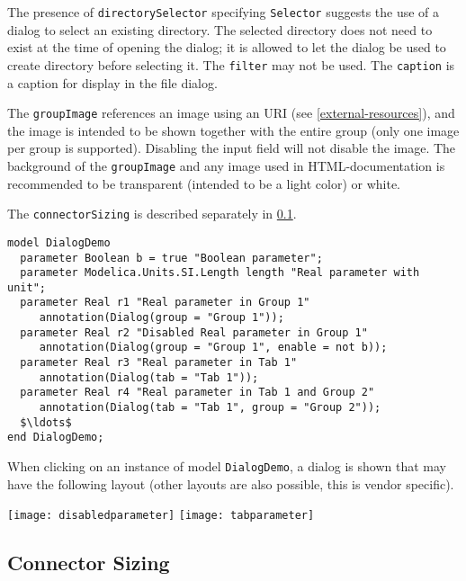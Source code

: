 The presence of \lstinline!directorySelector! specifying \lstinline!Selector! suggests the use of a dialog to select an existing directory.
The selected directory does not need to exist at the time of opening the dialog; it is allowed to let the dialog be used to create directory before selecting it.
The \lstinline!filter! may not be used.
The \lstinline!caption! is a caption for display in the file dialog.

The \lstinline!groupImage! references an image using an URI (see \cref{external-resources}), and the image is intended to be shown together with the entire group (only one image per group is supported).
Disabling the input field will not disable the image.
The background of the \lstinline!groupImage! and any image used in HTML-documentation is recommended to be transparent (intended to be a light color) or white.

The \lstinline!connectorSizing! is described separately in \cref{connector-sizing}.

\begin{example}
\begin{lstlisting}[language=modelica]
model DialogDemo
  parameter Boolean b = true "Boolean parameter";
  parameter Modelica.Units.SI.Length length "Real parameter with unit";
  parameter Real r1 "Real parameter in Group 1"
     annotation(Dialog(group = "Group 1"));
  parameter Real r2 "Disabled Real parameter in Group 1"
     annotation(Dialog(group = "Group 1", enable = not b));
  parameter Real r3 "Real parameter in Tab 1"
     annotation(Dialog(tab = "Tab 1"));
  parameter Real r4 "Real parameter in Tab 1 and Group 2"
     annotation(Dialog(tab = "Tab 1", group = "Group 2"));
  $\ldots$
end DialogDemo;
\end{lstlisting}
When clicking on an instance of model \lstinline!DialogDemo!, a dialog is shown that may have the following layout (other layouts are also possible, this is vendor specific).

\begin{center}
\texttt{[image: disabledparameter]}
\quad
\texttt{[image: tabparameter]}\\
\end{center}
\end{example}

\subsection{Connector Sizing}\label{connector-sizing}


